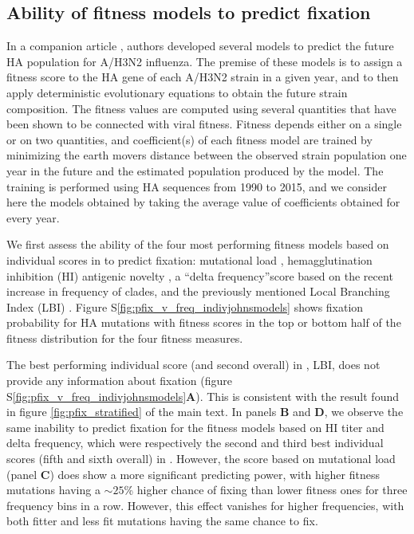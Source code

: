 \documentclass[reprint,amsmath,amssymb,superscriptaddress,showpacs,rmp]{revtex4-1}
\newcommand{\sref}[1]{S\ref{#1}}
\begin{document}

\subsection{Ability of fitness models to predict fixation} %
\label{sub:ability_of_fitness_models_to_predict_fixation}

In a companion article \citep{huddleston_integrating_2020}, authors developed several models to predict the future HA population for A/H3N2 influenza.
The premise of these models is to assign a fitness score to the HA gene of each A/H3N2 strain in a given year, and to then apply deterministic evolutionary equations to obtain the future strain composition.
The fitness values are computed using several quantities that have been shown to be connected with viral fitness.
Fitness depends either on a single or on two quantities, and coefficient(s) of each fitness model are trained by minimizing the earth movers distance between the observed strain population one year in the future and the estimated population produced by the model.
The training is performed using HA sequences from 1990 to 2015, and we consider here the models obtained by taking the average value of coefficients obtained for every year.


We first assess the ability of the four most performing fitness models based on individual scores in \citep{huddleston_integrating_2020} to predict fixation: mutational load \citep{luksza_predictive_2014}, hemagglutination inhibition (HI) antigenic novelty \citep{neher_prediction_2016}, a ``delta frequency''score based on the recent increase in frequency of clades, and the previously mentioned Local Branching Index (LBI) \citep{neher_predicting_2014}.
Figure \sref{fig:pfix_v_freq_indivjohnsmodels} shows fixation probability for HA mutations with fitness scores in the top or bottom half of the fitness distribution for the four fitness measures.

The best performing individual score (and second overall) in \citep{huddleston_integrating_2020}, LBI, does not provide any information about fixation (figure \sref{fig:pfix_v_freq_indivjohnsmodels}\textbf{A}).
This is consistent with the result found in figure \ref{fig:pfix_stratified} of the main text.
In panels \textbf{B} and \textbf{D}, we observe the same inability to predict fixation for the fitness models based on HI titer and delta frequency, which were respectively the second and third best individual scores (fifth and sixth overall) in \citep{huddleston_integrating_2020}.
However, the score based on mutational load (panel \textbf{C}) does show a more significant predicting power, with higher fitness mutations having a $\sim 25$\% higher chance of fixing than lower fitness ones for three frequency bins in a row.
However, this effect vanishes for higher frequencies, with both fitter and less fit mutations having the same chance to fix.
\end{document}
